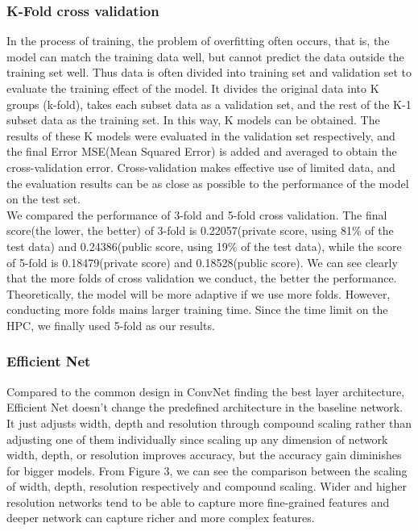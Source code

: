 \documentclass[final]{cvpr}
\begin{document}
\subsubsection{K-Fold cross validation}

In the process of training, the problem of overfitting often occurs, that is, the model can match the training data well, but cannot predict the data outside the training set well. Thus data is often divided into training set and validation set to evaluate the training effect of the model.
It divides the original data into K groups (k-fold), takes each subset data as a validation set, and the rest of the K-1 subset data as the training set. In this way, K models can be obtained. The results of these K models were evaluated in the validation set respectively, and the final Error MSE(Mean Squared Error) is added and averaged to obtain the cross-validation error. Cross-validation makes effective use of limited data, and the evaluation results can be as close as possible to the performance of the model on the test set.
\\
We compared the performance of 3-fold and 5-fold cross validation. The final score(the lower, the better) of 3-fold is 0.22057(private score, using 81\% of the test data) and 0.24386(public score, using 19\% of the test data), while the score of 5-fold is 0.18479(private score) and 0.18528(public score). We can see clearly that the more folds of cross validation we conduct, the better the performance. Theoretically, the model will be more adaptive if we use more folds. However, conducting more folds mains larger training time. Since the time limit on the HPC, we finally used 5-fold as our results.

\subsubsection{Efficient Net}

Compared to the common design in ConvNet finding the best layer architecture, Efficient Net doesn't change the predefined architecture in the baseline network. It just adjusts width, depth and resolution through compound scaling rather than adjusting one of them individually since scaling up any dimension of network width, depth, or resolution improves accuracy, but the accuracy gain diminishes for bigger models. From Figure 3, we can see the comparison between the scaling of width, depth, resolution respectively and compound scaling. Wider and higher resolution networks tend to be able to capture more fine-grained features and deeper network can capture richer and more complex features.
\end{document}
